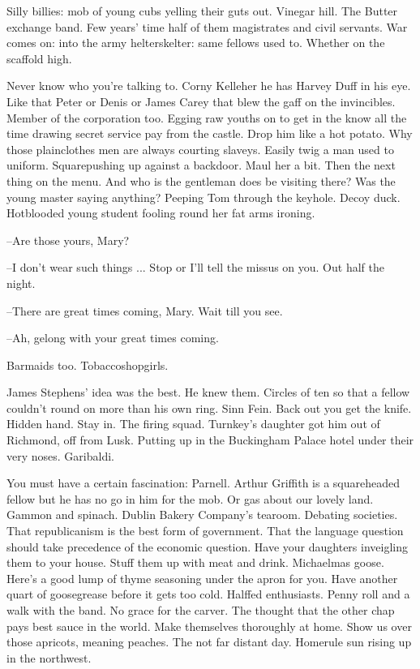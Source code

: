 Silly billies: mob of young cubs yelling their guts out. Vinegar hill.
The Butter exchange band. Few years' time half of them magistrates and
civil servants. War comes on: into the army helterskelter: same fellows
used to. Whether on the scaffold high.

Never know who you're talking to. Corny Kelleher he has Harvey
Duff in his eye. Like that Peter or Denis or James Carey that blew the
gaff on the invincibles. Member of the corporation too. Egging raw youths
on to get in the know all the time drawing secret service pay from the
castle. Drop him like a hot potato. Why those plainclothes men are always
courting slaveys. Easily twig a man used to uniform. Squarepushing up
against a backdoor. Maul her a bit. Then the next thing on the menu. And
who is the gentleman does be visiting there? Was the young master saying
anything? Peeping Tom through the keyhole. Decoy duck. Hotblooded young
student fooling round her fat arms ironing.

--Are those yours, Mary?

--I don't wear such things ... Stop or I'll tell the missus on you.
Out half the night.

--There are great times coming, Mary. Wait till you see.

--Ah, gelong with your great times coming.

Barmaids too. Tobaccoshopgirls.

James Stephens' idea was the best. He knew them. Circles of ten so
that a fellow couldn't round on more than his own ring. Sinn Fein. Back
out you get the knife. Hidden hand. Stay in. The firing squad. Turnkey's
daughter got him out of Richmond, off from Lusk. Putting up in the
Buckingham Palace hotel under their very noses. Garibaldi.

You must have a certain fascination: Parnell. Arthur Griffith is a
squareheaded fellow but he has no go in him for the mob. Or gas about our
lovely land. Gammon and spinach. Dublin Bakery Company's tearoom.
Debating societies. That republicanism is the best form of government.
That the language question should take precedence of the economic
question. Have your daughters inveigling them to your house. Stuff them
up with meat and drink. Michaelmas goose. Here's a good lump of thyme
seasoning under the apron for you. Have another quart of goosegrease
before it gets too cold. Halffed enthusiasts. Penny roll and a walk with
the band. No grace for the carver. The thought that the other chap pays
best sauce in the world. Make themselves thoroughly at home. Show us over
those apricots, meaning peaches. The not far distant day. Homerule sun
rising up in the northwest.

